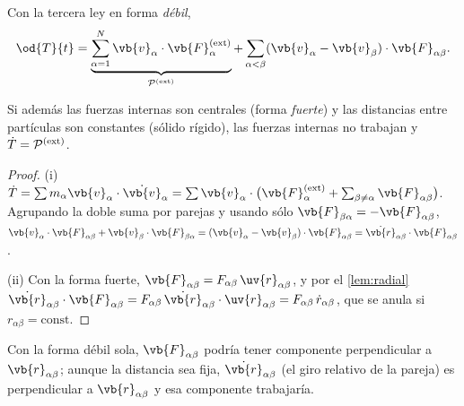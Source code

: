 \begin{proposicion}
\label{prop:dT}
\begin{casos}
  \item Con la tercera ley en forma \emph{débil},
  \begin{equation}
    \od{T}{t}=\underbrace{\sa\vb{v}_{\alpha}\cdot\vb{F}_{\alpha}\ext}_{\mathcal{P}\ext}
    +\sab(\vb{v}_{\alpha}-\vb{v}_{\beta})\cdot\vb{F}_{\alpha\beta} .
    \label{eq:dT}
  \end{equation}
  \item Si además las fuerzas internas son centrales (forma \emph{fuerte}) y las
  distancias entre partículas son constantes (sólido rígido), las fuerzas
  internas no trabajan y $\dot T=\mathcal{P}^{(\mathrm{ext})}$.
\end{casos}
\end{proposicion}

\begin{proof}
(i) $\dot T=\sum m_{\alpha}\vb{v}_{\alpha}\cdot\dot{\vb{v}}_{\alpha}=\sum\vb{v}_{\alpha}\cdot\bigl(\vb{F}_{\alpha}\ext+\sum_{\beta\neq\alpha}\vb{F}_{\alpha\beta}\bigr)$.
Agrupando la doble suma por parejas y usando sólo $\vb{F}_{\beta\alpha}=-\vb{F}_{\alpha\beta}$,
$\vb{v}_{\alpha}\cdot\vb{F}_{\alpha\beta}+\vb{v}_{\beta}\cdot\vb{F}_{\beta\alpha}=(\vb{v}_{\alpha}-\vb{v}_{\beta})\cdot\vb{F}_{\alpha\beta}=\dot{\vb{r}}_{\alpha\beta}\cdot\vb{F}_{\alpha\beta}$.

\noindent(ii) Con la forma fuerte, $\vb{F}_{\alpha\beta}=F_{\alpha\beta}\,\uv{r}_{\alpha\beta}$, y por el \cref{lem:radial}
$\dot{\vb{r}}_{\alpha\beta}\cdot\vb{F}_{\alpha\beta}=F_{\alpha\beta}\,\dot{\vb{r}}_{\alpha\beta}\cdot\uv{r}_{\alpha\beta}=F_{\alpha\beta}\,\dot r_{\alpha\beta}$, que se anula si
$r_{\alpha\beta}=\text{const}$.
\end{proof}

\begin{observacion}
Con la forma débil sola, $\vb{F}_{\alpha\beta}$ podría tener componente perpendicular
a $\vb{r}_{\alpha\beta}$; aunque la distancia sea fija, $\dot{\vb{r}}_{\alpha\beta}$ (el giro relativo
de la pareja) es perpendicular a $\vb{r}_{\alpha\beta}$ y esa componente trabajaría.
\end{observacion}

